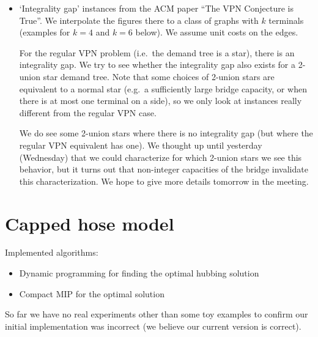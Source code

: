 \documentclass[11pt]{article}
\begin{document}
\begin{itemize}
        \item `Integrality gap' instances from the ACM paper ``The VPN Conjecture is True''.
        We interpolate the figures there to a class of graphs with $k$ terminals (examples for $k=4$ and $k=6$ below).
        We assume unit costs on the edges.

        For the regular VPN problem (i.e.\ the demand tree is a star), there is an integrality gap.
        We try to see whether the integrality gap also exists for a 2-union star demand tree.
        Note that some choices of 2-union stars are equivalent to a normal star (e.g.\ a sufficiently large bridge capacity, or when there is at most one terminal on a side), so we only look at instances really different from the regular VPN case.

        We do see some 2-union stars where there is no integrality gap (but where the regular VPN equivalent has one).
        We thought up until yesterday (Wednesday) that we could characterize for which 2-union stars we see this behavior, but it turns out that non-integer capacities of the bridge invalidate this characterization.
        We hope to give more details tomorrow in the meeting.

    \end{itemize}

    \section{Capped hose model}
    Implemented algorithms:
    \begin{itemize}
        \item Dynamic programming for finding the optimal hubbing solution
        \item Compact MIP for the optimal solution
    \end{itemize}

    So far we have no real experiments other than some toy examples to confirm our initial implementation was incorrect (we believe our current version is correct).
\end{document}

